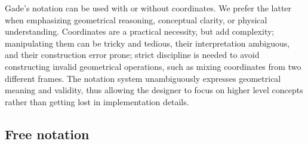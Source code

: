 




Gade's notation can be used with or without coordinates. We prefer the latter when emphasizing geometrical reasoning, conceptual clarity, or physical understanding. Coordinates are a practical necessity, but add complexity; manipulating them can be tricky and tedious, their interpretation ambiguous, and their construction error prone; strict discipline is needed to avoid constructing invalid geometrical operations, such as mixing coordinates from two different frames. The notation system unambiguously expresses geometrical meaning and validity, thus allowing the designer to focus on higher level concepts rather than getting lost in implementation details. 

\subsection{Free notation}\label{IV_sec:general_notation}



